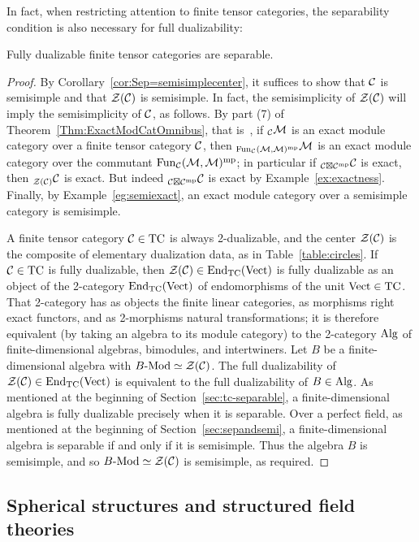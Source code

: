 \documentclass{amsart}
\begin{document}
In fact, when restricting attention to finite tensor categories, the separability condition is also necessary for full dualizability:
\begin{theorem}
Fully dualizable finite tensor categories are separable.
\end{theorem}
\begin{proof}
By Corollary~\ref{cor:Sep=semisimplecenter}, it suffices to show that $\mathcal C$ is semisimple and that $\mathcal Z(\mathcal C)$ is semisimple.  In fact, the semisimplicity of $\mathcal Z(\mathcal C)$ will imply the semisimplicity of $\mathcal C$, as follows.  By part (7) of Theorem~\ref{Thm:ExactModCatOmnibus}, that is~\cite[Lemma 3.25]{EO-ftc}, if ${}_\mathcal C \mathcal M$ is an exact module category over a finite tensor category $\mathcal C$, then ${}_{\operatorname{Fun}_\mathcal C(\mathcal M,\mathcal M)^{\mathrm{mp}}} \mathcal M$ is an exact module category over the commutant $\operatorname{Fun}_\mathcal C(\mathcal M,\mathcal M)^{\mathrm{mp}}$; in particular if ${}_{\mathcal C \boxtimes \mathcal C^{\mathrm{mp}}} \mathcal C$ is exact, then ${}_{\mathcal Z(\mathcal C)} \mathcal C$ is exact.  But indeed ${}_{\mathcal C \boxtimes \mathcal C^{\mathrm{mp}}} \mathcal C$ is exact by Example~\ref{ex:exactness}.  Finally, by Example~\ref{eg:semiexact}, an exact module category over a semisimple category is semisimple.

A finite tensor category $\mathcal C \in \mathrm{TC}$ is always 2-dualizable, and the center $\mathcal Z(\mathcal C)$ is the composite of elementary dualization data, as in Table~\ref{table:circles}.  If $\mathcal C \in \mathrm{TC}$ is fully dualizable, then $\mathcal Z(\mathcal C) \in \operatorname{End}_{\mathrm{TC}}(\mathrm{Vect})$ is fully dualizable as an object of the 2-category $\operatorname{End}_{\mathrm{TC}}(\mathrm{Vect})$ of endomorphisms of the unit $\mathrm{Vect} \in \mathrm{TC}$.  That 2-category has as objects the finite linear categories, as morphisms right exact functors, and as 2-morphisms natural transformations; it is therefore equivalent (by taking an algebra to its module category) to the 2-category $\mathrm{Alg}$ of finite-dimensional algebras, bimodules, and intertwiners.  Let $B$ be a finite-dimensional algebra with $\Mod{B}{} \simeq \cZ(\cC)$.  The full dualizability of $\mathcal Z(\mathcal C) \in \operatorname{End}_{\mathrm{TC}}(\mathrm{Vect})$ is equivalent to the full dualizability of $B \in \mathrm{Alg}$.  As mentioned at the beginning of Section~\ref{sec:tc-separable}, a finite-dimensional algebra is fully dualizable precisely when it is separable.  Over a perfect field, as mentioned at the beginning of Section~\ref{sec:sepandsemi}, a finite-dimensional algebra is separable if and only if it is semisimple.  Thus the algebra $B$ is semisimple, and so $\Mod{B}{} \simeq \cZ(\cC)$ is semisimple, as required.
\end{proof}


\subsection{Spherical structures and structured field theories} \label{sec:spherical}
\end{document}
